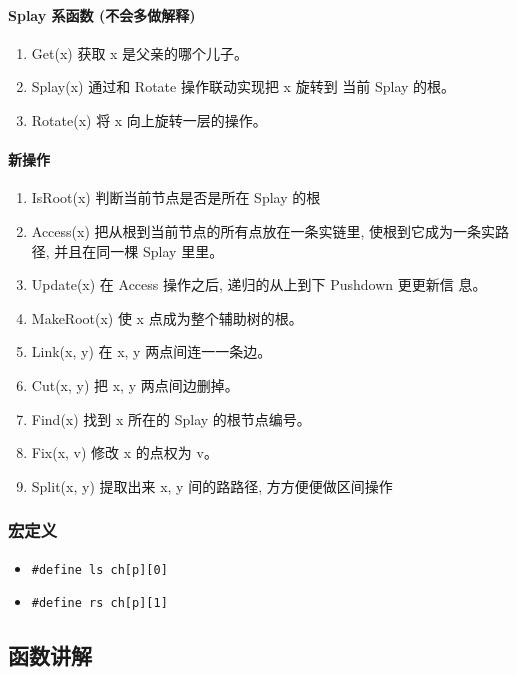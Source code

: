 \paragraph{Splay 系函数 (不会多做解释)}

\begin{enumerate}
\item Get(x) 获取 x 是父亲的哪个⼉子。
\item Splay(x) 通过和 Rotate 操作联动实现把 x 旋转到 当前 Splay 的根。 
\item Rotate(x) 将 x 向上旋转一层的操作。
\end{enumerate}

\paragraph{新操作}

\begin{enumerate}
\item IsRoot(x) 判断当前节点是否是所在 Splay 的根
\item Access(x) 把从根到当前节点的所有点放在⼀条实链里, 使根到它成为一条实路径, 并且在同一棵 Splay 里里。
\item Update(x) 在 Access 操作之后, 递归的从上到下 Pushdown 更更新信 息。
\item MakeRoot(x) 使 x 点成为整个辅助树的根。
\item Link(x, y) 在 x, y 两点间连⼀一条边。
\item Cut(x, y) 把 x, y 两点间边删掉。
\item Find(x) 找到 x 所在的 Splay 的根节点编号。
\item Fix(x, v) 修改 x 的点权为 v。
\item Split(x, y) 提取出来 x, y 间的路路径, ⽅方便便做区间操作
\end{enumerate}

\subsubsection{宏定义}

\begin{itemize}
\item \texttt{#define ls ch[p][0]}
\item \texttt{#define rs ch[p][1]}
\end{itemize}

\subsection{函数讲解}


